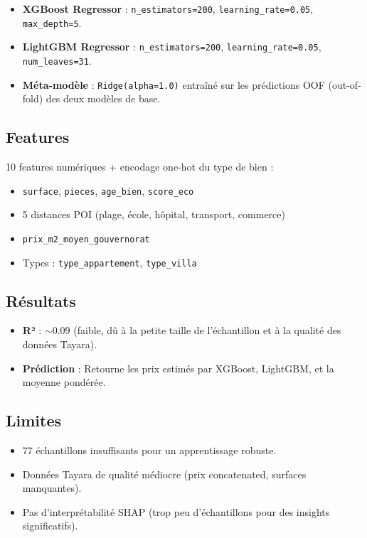 \documentclass[12pt,a4paper]{report}
\begin{document}
\begin{itemize}
    \item \textbf{XGBoost Regressor} : \texttt{n\_estimators=200}, \texttt{learning\_rate=0.05}, \texttt{max\_depth=5}.
    \item \textbf{LightGBM Regressor} : \texttt{n\_estimators=200}, \texttt{learning\_rate=0.05}, \texttt{num\_leaves=31}.
    \item \textbf{Méta-modèle} : \texttt{Ridge(alpha=1.0)} entraîné sur les prédictions OOF (out-of-fold) des deux modèles de base.
\end{itemize}

\subsection{Features}
10 features numériques + encodage one-hot du type de bien :
\begin{itemize}
    \item \texttt{surface}, \texttt{pieces}, \texttt{age\_bien}, \texttt{score\_eco}
    \item 5 distances POI (plage, école, hôpital, transport, commerce)
    \item \texttt{prix\_m2\_moyen\_gouvernorat}
    \item Types : \texttt{type\_appartement}, \texttt{type\_villa}
\end{itemize}

\subsection{Résultats}
\begin{itemize}
    \item \textbf{R²} : $\sim$0.09 (faible, dû à la petite taille de l'échantillon et à la qualité des données Tayara).
    \item \textbf{Prédiction} : Retourne les prix estimés par XGBoost, LightGBM, et la moyenne pondérée.
\end{itemize}

\subsection{Limites}
\begin{itemize}
    \item 77 échantillons insuffisants pour un apprentissage robuste.
    \item Données Tayara de qualité médiocre (prix concatenated, surfaces manquantes).
    \item Pas d'interprétabilité SHAP (trop peu d'échantillons pour des insights significatifs).
\end{itemize}
\end{document}
